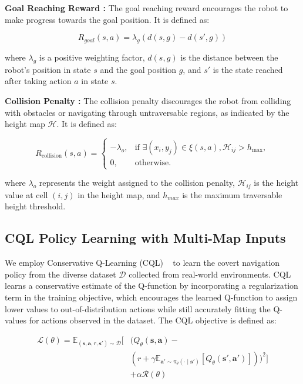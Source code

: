 \textbf{Goal Reaching Reward : }The goal reaching reward encourages the robot to make progress towards the goal position. It is defined as:

\begin{equation}
R_{goal}(s, a) = \lambda_g (d(s, g) - d(s', g))
\end{equation}

where $\lambda_g$ is a positive weighting factor, $d(s, g)$ is the distance between the robot's position in state $s$ and the goal position $g$, and $s'$ is the state reached after taking action $a$ in state $s$.

\textbf{Collision Penalty : }The collision penalty discourages the robot from colliding with obstacles or navigating through untraversable regions, as indicated by the height map $\mathcal{H}$. It is defined as:

\begin{equation}
R_{\text{collision}}(s, a) = 
\begin{cases}
-\lambda_o, & \text{if } \exists (x_i, y_j) \in \xi(s, a), \mathcal{H}_{ij} > h_{\max}, \\
0, & \text{otherwise.}
\end{cases}
\end{equation}



where $\lambda_o$ represents the weight assigned to the collision penalty, $\mathcal{H}_{ij}$ is the height value at cell $(i, j)$ in the height map, and $h_{max}$ is the maximum traversable height threshold.

\subsection{CQL Policy Learning with Multi-Map Inputs}

We employ Conservative Q-Learning (CQL) ~\cite{kumar2020conservative} to learn the covert navigation policy from the diverse dataset $\mathcal{D}$ collected from real-world environments. CQL learns a conservative estimate of the Q-function by incorporating a regularization term in the training objective, which encourages the learned Q-function to assign lower values to out-of-distribution actions while still accurately fitting the Q-values for actions observed in the dataset. The CQL objective is defined as:

\begin{equation}
\begin{split}
\mathcal{L}(\theta) = \mathbb{E}_{(\mathbf{s}, \mathbf{a}, r, \mathbf{s}') \sim \mathcal{D}} \Big[ &(Q_\theta(\mathbf{s}, \mathbf{a}) - \\
&(r + \gamma \mathbb{E}_{\mathbf{a}' \sim \pi_\theta(\cdot \mid \mathbf{s}')}[Q_\theta(\mathbf{s}', \mathbf{a}')]))^2 \Big] \\
&+ \alpha \mathcal{R}(\theta)
\end{split}
\end{equation}


